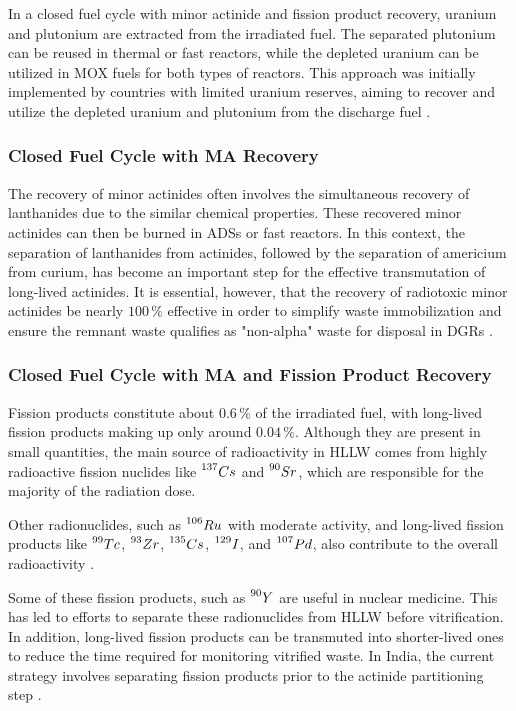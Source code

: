 In a closed fuel cycle with minor actinide and fission product recovery, uranium and plutonium are extracted from the irradiated fuel. The separated plutonium can be reused in thermal or fast reactors, while the depleted uranium can be utilized in MOX fuels for both types of reactors. This approach was initially implemented by countries with limited uranium reserves, aiming to recover and utilize the depleted uranium and plutonium from the discharge fuel \cite{fuel_cycle_book}.


\subsubsection{Closed Fuel Cycle with MA Recovery}

The recovery of minor actinides often involves the simultaneous recovery of lanthanides due to the similar chemical properties. These recovered minor actinides can then be burned in ADSs or fast reactors. In this context, the separation of lanthanides from actinides, followed by the separation of americium from curium, has become an important step for the effective transmutation of long-lived actinides. It is essential, however, that the recovery of radiotoxic minor actinides be nearly \(100 \, \%\) effective in order to simplify waste immobilization and ensure the remnant waste qualifies as "non-alpha" waste for disposal in DGRs \cite{fuel_cycle_book}.

\subsubsection{Closed Fuel Cycle with MA and Fission Product Recovery}

Fission products constitute about \(0.6 \, \%\) of the irradiated fuel, with long-lived fission products making up only around \(0.04 \, \%\). Although they are present in small quantities, the main source of radioactivity in HLLW comes from highly radioactive fission nuclides like \(\prescript{137}{}{Cs}\) and \(\prescript{90}{}{Sr}\), which are responsible for the majority of the radiation dose. 

Other radionuclides, such as \(\prescript{106}{}{Ru}\) with moderate activity, and long-lived fission products like \(\prescript{99}{}{Tc}\), \(\prescript{93}{}{Zr}\), \(\prescript{135}{}{Cs}\), \(\prescript{129}{}{I}\), and \(\prescript{107}{}{Pd}\), also contribute to the overall radioactivity \cite{fuel_cycle_book}.

Some of these fission products, such as \(\prescript{90}{}{Y}\) are useful in nuclear medicine. This has led to efforts to separate these radionuclides from HLLW before vitrification. In addition, long-lived fission products can be transmuted into shorter-lived ones to reduce the time required for monitoring vitrified waste. In India, the current strategy involves separating fission products prior to the actinide partitioning step \cite{fuel_cycle_book}.

